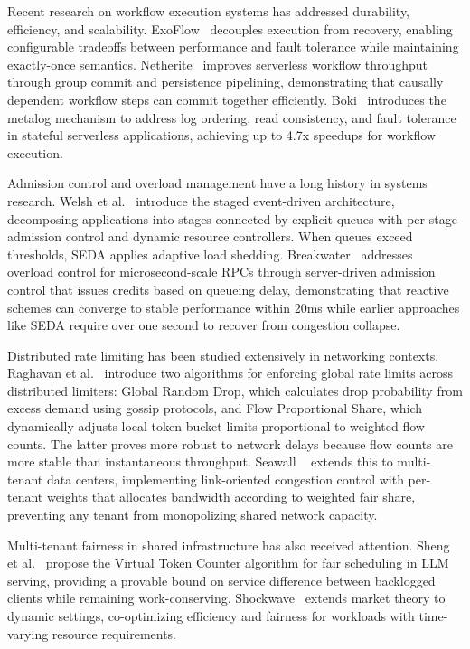 \documentclass{article}
\begin{document}
Recent research on workflow execution systems has addressed durability, efficiency, and scalability. ExoFlow~\cite{exoflow} decouples execution from recovery, enabling configurable tradeoffs between performance and fault tolerance while maintaining exactly-once semantics. Netherite~\cite{netherite} improves serverless workflow throughput through group commit and persistence pipelining, demonstrating that causally dependent workflow steps can commit together efficiently. Boki~\cite{boki} introduces the metalog mechanism to address log ordering, read consistency, and fault tolerance in stateful serverless applications, achieving up to 4.7x speedups for workflow execution.

Admission control and overload management have a long history in systems research. Welsh et al.~\cite{seda} introduce the staged event-driven architecture, decomposing applications into stages connected by explicit queues with per-stage admission control and dynamic resource controllers. When queues exceed thresholds, SEDA applies adaptive load shedding. Breakwater~\cite{breakwater} addresses overload control for microsecond-scale RPCs through server-driven admission control that issues credits based on queueing delay, demonstrating that reactive schemes can converge to stable performance within 20ms while earlier approaches like SEDA require over one second to recover from congestion collapse.

Distributed rate limiting has been studied extensively in networking contexts. Raghavan et al.~\cite{drl} introduce two algorithms for enforcing global rate limits across distributed limiters: Global Random Drop, which calculates drop probability from excess demand using gossip protocols, and Flow Proportional Share, which dynamically adjusts local token bucket limits proportional to weighted flow counts. The latter proves more robust to network delays because flow counts are more stable than instantaneous throughput.
Seawall ~\cite{seawall} extends this to multi-tenant data centers, implementing link-oriented congestion control with per-tenant weights that allocates bandwidth according to weighted fair share, preventing any tenant from monopolizing shared network capacity.

Multi-tenant fairness in shared infrastructure has also received attention. Sheng et al.~\cite{vtc} propose the Virtual Token Counter algorithm for fair scheduling in LLM serving, providing a provable bound on service difference between backlogged clients while remaining work-conserving. Shockwave~\cite{shockwave} extends market theory to dynamic settings, co-optimizing efficiency and fairness for workloads with time-varying resource requirements.
\end{document}
